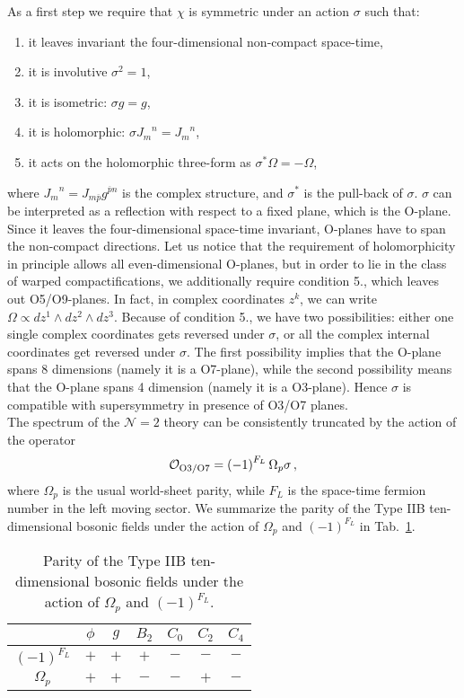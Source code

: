 \documentclass[12pt,a4paper]{book}
\begin{document}
As a first step we require that $\chi$ is symmetric under an action $\sigma$ such that:
\begin{enumerate}
\item it leaves invariant the four-dimensional non-compact space-time,
\item it is involutive $\sigma^2 = 1$,
\item it is isometric: $\sigma g = g$,
\item it is holomorphic: $\sigma {J_m}^n = {J_m}^n$,
\item it acts on the holomorphic three-form as $\sigma^* \Omega = - \Omega$,
\end{enumerate}
where ${J_m}^n = J_{m \overline{p}} g^{\overline{p} n}$ is the complex structure, and $\sigma^*$ is the pull-back of $\sigma$. $\sigma$ can be interpreted as a reflection with respect to a fixed plane, which is the O-plane. Since it leaves the four-dimensional space-time invariant, O-planes have to span the non-compact directions. Let us notice that the requirement of holomorphicity in principle allows all even-dimensional O-planes, but in order to lie in the class of warped compactifications, we additionally require condition 5., which leaves out O5/O9-planes. In fact, in complex coordinates $z^k$, we can write $\Omega \propto dz^1 \wedge dz^2 \wedge dz^3$. Because of condition 5., we have two possibilities: either one single complex coordinates gets reversed under $\sigma$, or all the complex internal coordinates get reversed under $\sigma$. The first possibility implies that the O-plane spans 8 dimensions (namely it is a O7-plane), while the second possibility means that the O-plane spans 4 dimension (namely it is a O3-plane). Hence $\sigma$ is compatible with supersymmetry in presence of O3/O7 planes.\\

The spectrum of the $\mathcal{N} = 2$ theory can be consistently truncated by the action of the operator
\begin{align}
\label{eq:OrientifoldInvolution}
\mathcal{O}_{\rm O3/O7} = \left(-1\right)^{F_L} \Omega_p \sigma\,,
\end{align}
where $\Omega_p$ is the usual world-sheet parity, while $F_L$ is the space-time fermion number in the left moving sector.  We summarize the parity of the Type IIB ten-dimensional bosonic fields under the action of $\Omega_p$ and $\left(-1\right)^{F_L}$ in Tab.~\ref{tab:ParityOrientifold}.
\begin{table}[h!]
\begin{center}
\begin{tabular}{|c|c|c|c|c|c|c|}
\hline
 & $\phi$ & $g$ & $B_2$ & $C_0$ & $C_2$ & $C_4$\\
\hline
$\left(-1\right)^{F_L}$ & $+$ & $+$ & $+$ & $-$ & $-$ & $-$ \\
\hline
$\Omega_p$ & $+$ & $+$ & $-$ & $-$ & $+$ & $-$ \\
\hline
\end{tabular}
\caption{\label{tab:ParityOrientifold} 
Parity of the Type IIB ten-dimensional bosonic fields under the action of $\Omega_p$ and $\left(-1\right)^{F_L}$.}
\end{center}
\end{table}
\end{document}
